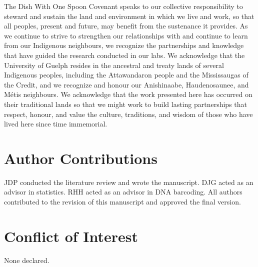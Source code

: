 The Dish With One Spoon Covenant speaks to our collective responsibility to steward and sustain the land and environment in which we live and work, so that all peoples, present and future, may benefit from the sustenance it provides. As we continue to strive to strengthen our relationships with and continue to learn from our Indigenous neighbours, we recognize the partnerships and knowledge that have guided the research conducted in our labs. We acknowledge that the University of Guelph resides in the ancestral and treaty lands of several Indigenous peoples, including the Attawandaron people and the Mississaugas of the Credit, and we recognize and honour our Anishinaabe, Haudenosaunee, and M{\'e}tis neighbours. We acknowledge that the work presented here has occurred on their traditional lands so that we might work to build lasting partnerships that respect, honour, and value the culture, traditions, and wisdom of those who have lived here since time immemorial.



\section*{Author Contributions}

JDP conducted the literature review and wrote the manuscript. DJG acted as an advisor in statistics. RHH acted as an advisor in DNA barcoding. All authors contributed to the revision of this manuscript and approved the final version. 



\section*{Conflict of Interest}

None declared.
